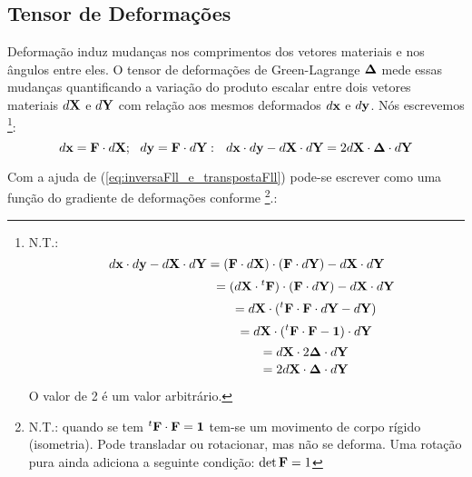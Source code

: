 \documentclass[
	11pt, %
	fleqn, %
	a4paper, %
]{LegrandOrangeBook}
\begin{document}
\subsection{Tensor de Deformações}

Deformação induz mudanças nos comprimentos dos vetores materiais e nos ângulos entre eles. O tensor de deformações de Green-Lagrange $\bm{\Delta}$ mede essas mudanças quantificando a variação do produto escalar entre dois vetores materiais $d\textbf{X}$ e $d\textbf{Y}$ com relação aos mesmos deformados $d\textbf{x}$ e $d\textbf{y}$. Nós escrevemos \footnote{N.T.: 
\begin{displaymath}	
	d\textbf{x} \cdot d\textbf{y} - d\textbf{X} \cdot d\textbf{Y} = (\textbf{F} \cdot d\textbf{X}) \cdot (\textbf{F} \cdot d\textbf{Y}) -  d\textbf{X} \cdot d\textbf{Y}
\end{displaymath}
\begin{displaymath}	
	~~~~~~~~~~~~~~~~~~~~~~~~~~~~ = (d\textbf{X} \cdot {}^t\textbf{F}) \cdot (\textbf{F} \cdot d\textbf{Y}) -  d\textbf{X} \cdot d\textbf{Y}
\end{displaymath}
\begin{displaymath}	
	~~~~~~~~~~~~~~~~~~~~~~~~~~~~ = d\textbf{X} \cdot ({}^t\textbf{F} \cdot \textbf{F} \cdot d\textbf{Y} -  d\textbf{Y})
\end{displaymath}
\begin{displaymath}	
	~~~~~~~~~~~~~~~~~~~~~~~~~~~~ = d\textbf{X} \cdot ({}^t\textbf{F} \cdot \textbf{F} -  \bm{1}) \cdot d\textbf{Y}
\end{displaymath}
\begin{displaymath}	
	~~~~~~~~~~~~~~~~~~~~~~~~~~~~ = d\textbf{X} \cdot 2 \bm{\Delta} \cdot d\textbf{Y}
\end{displaymath}
\begin{displaymath}	
	~~~~~~~~~~~~~~~~~~~~~~~~~~~~ = 2 d\textbf{X} \cdot \bm{\Delta} \cdot d\textbf{Y}
\end{displaymath}

O valor de 2 é um valor arbitrário.

}:
\begin{equation}
	\label{eq:dxdy}	
	d\textbf{x} = \textbf{F} \cdot d\textbf{X} ;  ~~ d\textbf{y} = \textbf{F} \cdot d\textbf{Y}: ~~ d\textbf{x} \cdot d\textbf{y} - d\textbf{X} \cdot d\textbf{Y} = 2d\textbf{X} \cdot \bm{\Delta} \cdot d\textbf{Y}
\end{equation}

Com a ajuda de (\ref{eq:inversaFll_e_transpostaFll}) pode-se escrever como uma função do gradiente de deformações conforme \footnote{N.T.: quando se tem ${}^t\textbf{F} \cdot \textbf{F} = \bm{1}$ tem-se um movimento de corpo rígido (isometria). Pode transladar ou rotacionar, mas não se deforma. Uma rotação pura ainda adiciona a seguinte condição: $\det {\textbf{F}}=1$}.:
\end{document}
